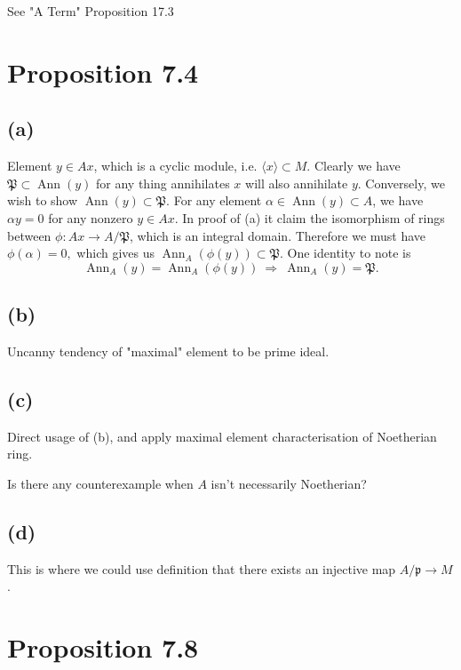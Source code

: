 See "A Term" \cite{altman} Proposition 17.3 

\section{Proposition 7.4}

\subsection{(a)}
Element $y\in Ax$, which is a cyclic module, i.e. $\langle x\rangle\subset M$.
Clearly we have $\mathfrak P\subset \operatorname{Ann}(y)$ for any thing annihilates $x$ will also annihilate $y$. 
Conversely, we wish to show $\operatorname{Ann}(y)\subset \mathfrak P$. For any element $\alpha\in \operatorname{Ann}(y)\subset A$, we have $\alpha y=0$ for any nonzero $y\in Ax$. In proof of (a) it claim the isomorphism of rings between $\phi:Ax\to A/\mathfrak P$, which is an integral domain. Therefore we must have $\phi(\alpha)=0,$ which gives us $\operatorname{Ann}_A(\phi(y))\subset \mathfrak P$. One identity to note is 
$$\operatorname{Ann}_A(y)=\operatorname{Ann}_A(\phi(y)) ~\Rightarrow~ \operatorname{Ann}_A(y)=\mathfrak P.$$

\subsection{(b)}

Uncanny tendency of "maximal" element to be prime ideal.

\subsection{(c)}

Direct usage of (b), and apply maximal element characterisation of Noetherian ring.

Is there any counterexample when $A$ isn't necessarily Noetherian?

\subsection{(d)}

This is where we could use definition that there exists an injective map $A/\mathfrak p\to M$.

\section{Proposition 7.8}

